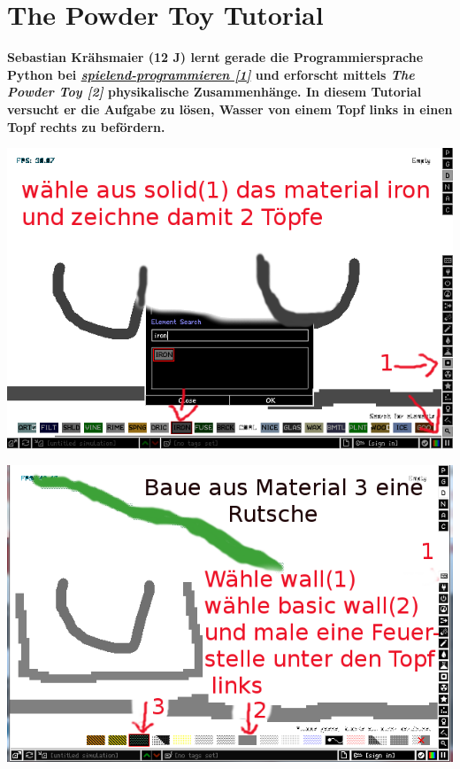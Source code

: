 \section*{The Powder Toy Tutorial}
\hypertarget{powdertoytutorial}{}
\label{powdertoytutorial}

\textbf{Sebastian Krähsmaier (12 J) lernt gerade die Programmiersprache Python bei \href{http://spielend-programmieren.at}{\textit{spielend-programmieren [1]}} und erforscht mittels \textit{The Powder Toy [2]} physikalische Zusammenhänge. In diesem Tutorial versucht er die Aufgabe zu lösen, Wasser von einem Topf links in einen Topf rechts zu befördern.}

\begin{center}
\includegraphics[width=\linewidth]{powdertoytutorial/powdertoytutorial1.png}
\end{center}

\begin{center}
\includegraphics[width=\linewidth]{powdertoytutorial/powdertoytutorial2.png}
\end{center}

